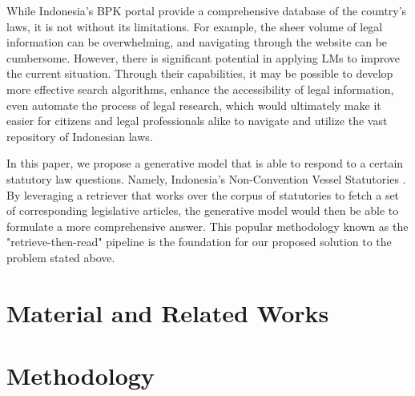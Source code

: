 \documentclass[conference]{IEEEtran}
\begin{document}
While Indonesia's BPK portal \cite{} provide a comprehensive database of the country's laws, it is not without
its limitations. For example, the sheer volume of legal information can be overwhelming, and navigating through
the website can be cumbersome. However, there is significant potential in applying LMs to improve the current
situation. Through their capabilities, it may be possible to develop more effective search algorithms, enhance
the accessibility of legal information, even automate the process of legal research, which would ultimately
make it easier for citizens and legal professionals alike to navigate and utilize the vast repository of
Indonesian laws.

In this paper, we propose a generative model that is able to respond to a certain statutory law questions.
Namely, Indonesia's Non-Convention Vessel Statutories \cite{}. By leveraging a retriever that works over the corpus
of statutories to fetch a set of corresponding legislative articles, the generative model would then be able
to formulate a more comprehensive answer. This popular methodology known as the "retrieve-then-read" pipeline
\cite{} is the foundation for our proposed solution to the problem stated above.


\section{Material and Related Works}

\section{Methodology}

\printbibliography
\end{document}
